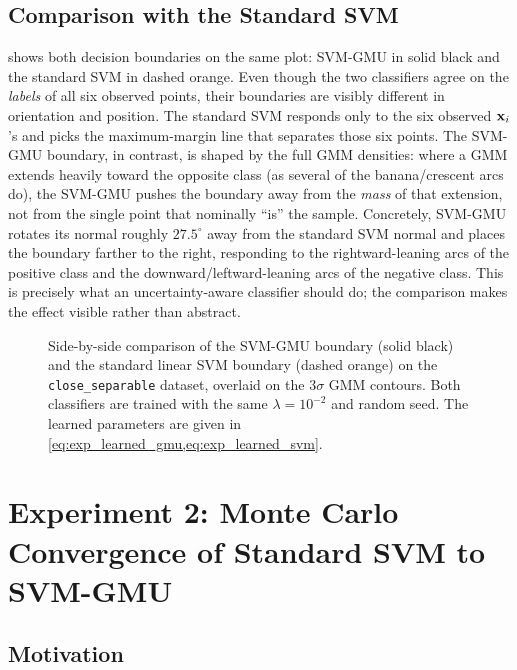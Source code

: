 \documentclass[11pt, letterpaper]{article}
\begin{document}
\subsection{Comparison with the Standard SVM}

 shows both decision boundaries on the same plot: SVM-GMU in solid black and the standard SVM in dashed orange. Even though the two classifiers agree on the \emph{labels} of all six observed points, their boundaries are visibly different in orientation and position. The standard SVM responds only to the six observed $\vb{x}_i$'s and picks the maximum-margin line that separates those six points. The SVM-GMU boundary, in contrast, is shaped by the full GMM densities: where a GMM extends heavily toward the opposite class (as several of the banana/crescent arcs do), the SVM-GMU pushes the boundary away from the \emph{mass} of that extension, not from the single point that nominally ``is'' the sample. Concretely, SVM-GMU rotates its normal roughly $27.5^{\circ}$ away from the standard SVM normal and places the boundary farther to the right, responding to the rightward-leaning arcs of the positive class and the downward/leftward-leaning arcs of the negative class. This is precisely what an uncertainty-aware classifier should do; the comparison makes the effect visible rather than abstract.

\begin{figure}[H]
    \centering
    \resizebox{0.75\textwidth}{!}{}
    \caption{Side-by-side comparison of the SVM-GMU boundary (solid black) and the standard linear SVM boundary (dashed orange) on the \texttt{close\_separable} dataset, overlaid on the $3\sigma$ GMM contours. Both classifiers are trained with the same $\lambda = 10^{-2}$ and random seed. The learned parameters are given in \cref{eq:exp_learned_gmu,eq:exp_learned_svm}.}
    \label{fig:exp_boundary_comparison}
\end{figure}

\section{Experiment 2: Monte Carlo Convergence of Standard SVM to SVM-GMU}\label{sec:exp_convergence}

\subsection{Motivation}\label{sec:exp_convergence_motivation}
\end{document}
